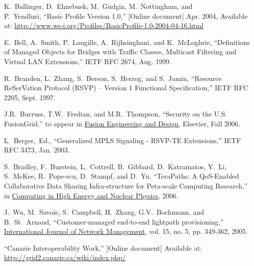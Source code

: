 \documentclass[conference]{IEEEtran}
\begin{document}
%
%
%
\begin{thebibliography}{1}

K.~Ballinger, D.~Ehnebusk, M.~Gudgin, M.~Nottingham, and~~~~\\
P.~Yendluri, ``Basic Profile Version 1.0,'' [Online document] Apr. 2004,
Available at:
\url{http://www.ws-i.org/Profiles/BasicProfile-1.0-2004-04-16.html}

E.~Bell, A.~Smith, P.~Langille, A.~Rijhsinghani, and K.~McLoghrie,
``Definitions of Managed Objects for Bridges with Traffic Classes, Multicast
Filtering and Virtual LAN Extensions,''
IETF RFC 2674, Aug. 1999.

R.~Branden, L.~Zhang, S.~Berson, S.~Herzog, and S.~Jamin,
``Resource ReSerVation Protocol (RSVP) -- Version 1 Functional
Specification,'' IETF RFC 2205, Sept. 1997.

J.R.~Burruss, T.W.~Fredian, and M.R.~Thompson,
``Security on the U.S. FusionGrid,''
to appear in \underline{Fusion Engineering and Design}, Elsevier, Fall 2006.

L.~Berger,~Ed.,
``Generalized MPLS Signaling - RSVP-TE Extensions,''
IETF RFC 3473, Jan. 2003.
 
S.~Bradley, F.~Burstein, L.~Cottrell, B.~Gibbard, D.~Katramatos, Y.~Li,
S.~McKee, R.~Pope-scu, D.~Stampf, and D.~Yu,
``TeraPaths: A QoS-Enabled Collaborative Data Sharing Infra-structure for
Peta-scale Computing Research,''
in \underline{Computing in High Energy and Nuclear Physics}, 2006.

J.~Wu, M.~Savoie, S.~Campbell, H.~Zhang, G.V.~Bochmann, and B.~St.~Arnaud,
``Customer-managed end-to-end lightpath provisioning,''
\underline{International Journal of Network Management},
vol. 15, no. 5, pp. 349-362, 2005.

``Canarie Interoperability Work,'' [Online document] Available at: \\
\url{http://grid2.canarie.ca/wiki/index.php/}


\end{thebibliography}
\end{document}
